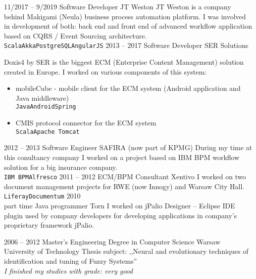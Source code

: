 \documentclass[9pt]{developercv} %
\begin{document}
\begin{entrylist}
	\entry
		{11/2017 -- 9/2019}
		{Software Developer}
		{JT Weston}
		{JT Weston is a company behind Makigami (Neula) business process automation platform. I was involved in development of both: back end and front end of advanced workflow application based on CQRS / Event Sourcing architecture.\\
		\texttt{Scala}\slashsep\texttt{Akka}\slashsep\texttt{PostgreSQL}\slashsep\texttt{AngularJS}}
	\entry
		{2013 -- 2017}
		{Software Developer}
		{SER Solutions}
		{Doxis4 by SER is the biggest ECM (Enterprise Content Management) solution created in Europe. I worked on various components of this system:
		\begin{itemize}
			\item mobileCube - mobile client for the ECM system (Android application and Java middleware) \\ \texttt{Java}\slashsep\texttt{Android}\slashsep\texttt{Spring}
			\item CMIS protocol connector for the ECM system \\ \texttt{Scala}\slashsep\texttt{Apache Tomcat}
		\end{itemize}}
	\entry
		{2012 -- 2013}
		{Software Engineer}
		{SAFIRA (now part of KPMG)}
		{During my time at this conultancy company I worked on a project based on IBM BPM workflow solution for a big insurance company. \\ \texttt{IBM BPM}\slashsep\texttt{Alfresco}}
	\entry
		{2011 -- 2012}
		{ECM/BPM Consultant}
		{Xentivo}
		{I worked on two document management projects for RWE (now Innogy) and Warsaw City Hall. \\ \texttt{Liferay}\slashsep\texttt{Documentum}}
	\entry
		{2010 \\\footnotesize{part time}}
		{Java programmer}
		{Torn}
		{I worked on jPalio Designer -- Eclipse IDE plugin used by company developers for developing applications in company's proprietary framework jPalio.}
			
\end{entrylist}



\begin{entrylist}
	\entry
		{2006 -- 2012}
		{Master's Engineering Degree in Computer Science}
		{Warsaw University of Technology}
		{Thesis subject: ,,Neural and evolutionary techniques of identification and tuning of Fuzzy Systems'' \\ \textit{I finished my studies with grade: very good}}
\end{entrylist}
\end{document}
